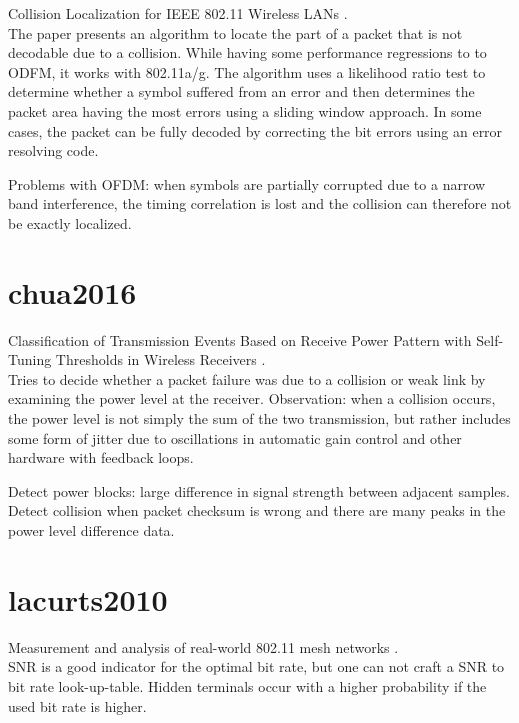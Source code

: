 Collision Localization for IEEE 802.11 Wireless LANs \cite{keene2010}.\\

The paper presents an algorithm to locate the part of a packet that is not decodable due to a collision. While having some performance regressions to to ODFM, it works with 802.11a/g. The algorithm uses a likelihood ratio test to determine whether a symbol suffered from an error and then determines the packet area having the most errors using a sliding window approach. In some cases, the packet can be fully decoded by correcting the bit errors using an error resolving code.

Problems with OFDM: when symbols are partially corrupted due to a narrow band interference, the timing correlation is lost and the collision can therefore not be exactly localized.



\section*{chua2016}

Classification of Transmission Events Based on Receive Power Pattern with Self-Tuning Thresholds in Wireless Receivers \cite{chua2016}.\\

Tries to decide whether a packet failure was due to a collision or weak link by examining the power level at the receiver. Observation: when a collision occurs, the power level is not simply the sum of the two transmission, but rather includes some form of jitter due to oscillations in automatic gain control and other hardware with feedback loops.

Detect power blocks: large difference in signal strength between adjacent samples. Detect collision when packet checksum is wrong and there are many peaks in the power level difference data.



\section*{lacurts2010}

Measurement and analysis of real-world 802.11 mesh networks \cite{lacurts2010}.\\

SNR is a good indicator for the optimal bit rate, but one can not craft a SNR to bit rate look-up-table. Hidden terminals occur with a higher probability if the used bit rate is higher.

